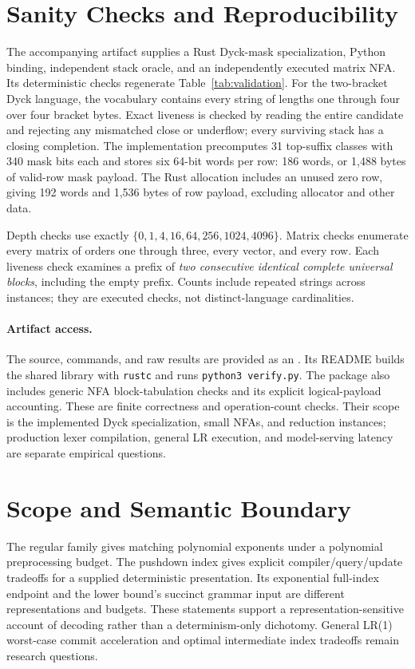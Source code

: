 \documentclass[manuscript,screen,11pt,nonacm]{acmart}
\theoremstyle{definition}\newtheorem{definition}{Definition}
\begin{document}
\section{Sanity Checks and Reproducibility}\label{sec:artifact}
The accompanying artifact supplies a Rust Dyck-mask specialization, Python binding, independent stack oracle, and an independently executed matrix NFA. Its deterministic checks regenerate Table~\ref{tab:validation}. For the two-bracket Dyck language, the vocabulary contains every string of lengths one through four over four bracket bytes. Exact liveness is checked by reading the entire candidate and rejecting any mismatched close or underflow; every surviving stack has a closing completion. The implementation precomputes 31 top-suffix classes with 340 mask bits each and stores six 64-bit words per row: 186 words, or 1,488 bytes of valid-row mask payload. The Rust allocation includes an unused zero row, giving 192 words and 1,536 bytes of row payload, excluding allocator and other data.

Depth checks use exactly $\{0,1,4,16,64,256,1024,4096\}$. Matrix checks enumerate every matrix of orders one through three, every vector, and every row. Each liveness check examines a prefix of \emph{two consecutive identical complete universal blocks}, including the empty prefix. Counts include repeated strings across instances; they are executed checks, not distinct-language cardinalities.



\paragraph{Artifact access.}
The source, commands, and raw results are provided as an . Its README builds the shared library with \texttt{rustc} and runs \texttt{python3 verify.py}. The package also includes generic NFA block-tabulation checks and its explicit logical-payload accounting. These are finite correctness and operation-count checks. Their scope is the implemented Dyck specialization, small NFAs, and reduction instances; production lexer compilation, general LR execution, and model-serving latency are separate empirical questions.

\section{Scope and Semantic Boundary}\label{sec:scope}
The regular family gives matching polynomial exponents under a polynomial preprocessing budget. The pushdown index gives explicit compiler/query/update tradeoffs for a supplied deterministic presentation. Its exponential full-index endpoint and the lower bound's succinct grammar input are different representations and budgets. These statements support a representation-sensitive account of decoding rather than a determinism-only dichotomy. General LR(1) worst-case commit acceleration and optimal intermediate index tradeoffs remain research questions.
\end{document}
